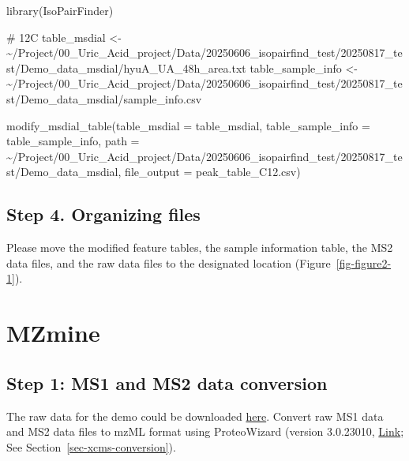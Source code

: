 \documentclass[
  letterpaper,
  DIV=11,
  numbers=noendperiod]{scrreprt}
\newenvironment{Shaded}{\begin{snugshade}}{\end{snugshade}}
\newcommand{\AttributeTok}[1]{\textcolor[rgb]{0.40,0.45,0.13}{#1}}
\newcommand{\CommentTok}[1]{\textcolor[rgb]{0.37,0.37,0.37}{#1}}
\newcommand{\FunctionTok}[1]{\textcolor[rgb]{0.28,0.35,0.67}{#1}}
\newcommand{\NormalTok}[1]{\textcolor[rgb]{0.00,0.23,0.31}{#1}}
\newcommand{\OtherTok}[1]{\textcolor[rgb]{0.00,0.23,0.31}{#1}}
\newcommand{\StringTok}[1]{\textcolor[rgb]{0.13,0.47,0.30}{#1}}
\begin{document}
\begin{Shaded}
\begin{Highlighting}[]
\FunctionTok{library}\NormalTok{(IsoPairFinder)}

\CommentTok{\# 12C}
\NormalTok{table\_msdial }\OtherTok{\textless{}{-}} \StringTok{\textquotesingle{}\textasciitilde{}/Project/00\_Uric\_Acid\_project/Data/20250606\_isopairfind\_test/20250817\_test/Demo\_data\_msdial/hyuA\_UA\_48h\_area.txt\textquotesingle{}}
\NormalTok{table\_sample\_info }\OtherTok{\textless{}{-}} \StringTok{\textquotesingle{}\textasciitilde{}/Project/00\_Uric\_Acid\_project/Data/20250606\_isopairfind\_test/20250817\_test/Demo\_data\_msdial/sample\_info.csv\textquotesingle{}}

\FunctionTok{modify\_msdial\_table}\NormalTok{(}\AttributeTok{table\_msdial =}\NormalTok{ table\_msdial,}
                    \AttributeTok{table\_sample\_info =}\NormalTok{ table\_sample\_info,}
                    \AttributeTok{path =} \StringTok{\textquotesingle{}\textasciitilde{}/Project/00\_Uric\_Acid\_project/Data/20250606\_isopairfind\_test/20250817\_test/Demo\_data\_msdial\textquotesingle{}}\NormalTok{,}
                    \AttributeTok{file\_output =} \StringTok{\textquotesingle{}peak\_table\_C12.csv\textquotesingle{}}\NormalTok{)}
\end{Highlighting}
\end{Shaded}

\subsection{Step 4. Organizing files}\label{step-4.-organizing-files-1}

Please move the modified feature tables, the sample information table,
the MS2 data files, and the raw data files to the designated location
(Figure~\ref{fig-figure2-1}).

\section{MZmine}\label{sec-mzmine}

\subsection{Step 1: MS1 and MS2 data
conversion}\label{step-1-ms1-and-ms2-data-conversion-1}

The raw data for the demo could be downloaded
\href{https://github.com/DoddLab/IsoPairFinder_DemoData_DiffTools/tree/main/00_raw_data}{here}.
Convert raw MS1 data and MS2 data files to mzML format using
ProteoWizard (version 3.0.23010,
\href{https://proteowizard.sourceforge.io/}{Link}; See
Section~\ref{sec-xcms-conversion}).
\end{document}
